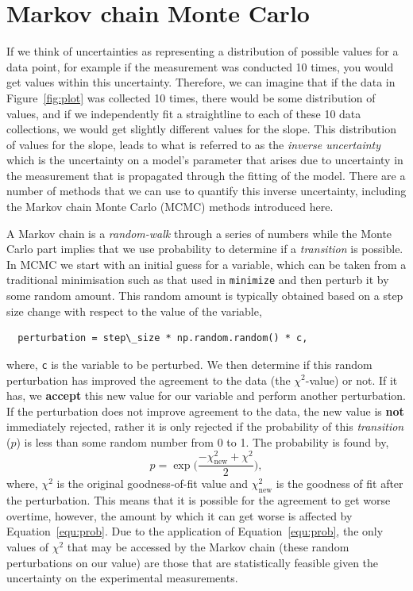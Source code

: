 \documentclass[a4paper]{article}
\begin{document}
\section{Markov chain Monte Carlo}
If we think of uncertainties as representing a distribution of possible values for a data point, for example if the measurement was conducted 10 times, you would get values within this uncertainty. 
Therefore, we can imagine that if the data in Figure~\ref{fig:plot} was collected 10 times, there would be some distribution of values, and if we independently fit a straightline to each of these 10 data collections, we would get slightly different values for the slope. 
This distribution of values for the slope, leads to what is referred to as the \emph{inverse uncertainty} which is the uncertainty on a model's parameter that arises due to uncertainty in the measurement that is propagated through the fitting of the model. 
There are a number of methods that we can use to quantify this inverse uncertainty, including the Markov chain Monte Carlo (MCMC) methods introduced here. 

A Markov chain is a \emph{random-walk} through a series of numbers while the Monte Carlo part implies that we use probability to determine if a \emph{transition} is possible.
In MCMC we start with an initial guess for a variable, which can be taken from a traditional minimisation such as that used in \texttt{minimize} and then perturb it by some random amount. 
This random amount is typically obtained based on a step size change with respect to the value of the variable, 
%
\begin{lstlisting}
  perturbation = step\_size * np.random.random() * c,
\end{lstlisting}
%
where, \texttt{c} is the variable to be perturbed.
We then determine if this random perturbation has improved the agreement to the data (the $\chi^2$-value) or not. 
If it has, we \textbf{accept} this new value for our variable and perform another perturbation. 
If the perturbation does not improve agreement to the data, the new value is \textbf{not} immediately rejected, rather it is only rejected if the probability of this \emph{transition} ($p$) is less than some random number from 0 to 1. 
The probability is found by, 
%
\begin{equation}
  p = \exp{\bigg(\frac{-\chi^2_{\text{new}} + \chi^2}{2}\bigg)},
  \label{equ:prob}
\end{equation}
%
where, $\chi^2$ is the original goodness-of-fit value and $\chi^2_{\text{new}}$ is the goodness of fit after the perturbation. 
This means that it is possible for the agreement to get worse overtime, however, the amount by which it can get worse is affected by Equation~\ref{equ:prob}. 
Due to the application of Equation~\ref{equ:prob}, the only values of $\chi^2$ that may be accessed by the Markov chain (these random perturbations on our value) are those that are statistically feasible given the uncertainty on the experimental measurements. 
\end{document}
